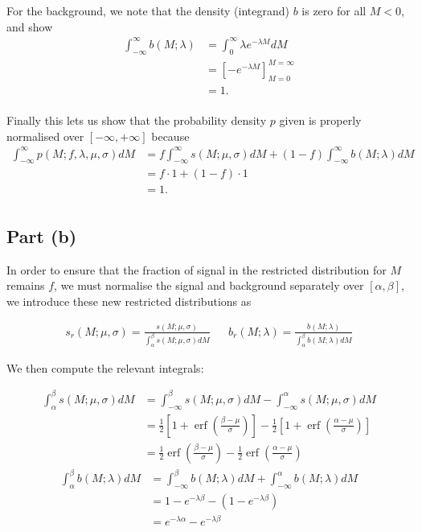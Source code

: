 \documentclass[12pt]{article}
\DeclareMathOperator{\erf}{erf}
\begin{document}
For the background, we note that the density (integrand) $b$ is zero for all $M<0$, and show
\begin{align*}
    \int_{-\infty}^\infty b(M;\lambda) & = \int_0^\infty \lambda e^{-\lambda M}dM \\
    & = \left[-e^{-\lambda M}\right]_{M=0}^{M=\infty} \\
    & = 1. \\
\end{align*}

Finally this lets us show that the probability density $p$ given is properly normalised over $[-\infty,+\infty]$ because
\begin{align*}
    \int_{-\infty}^\infty p(M; f,\lambda,\mu,\sigma)dM & = f\int_{-\infty}^\infty s(M;\mu, \sigma)dM + (1-f)\int_{-\infty}^\infty b(M;\lambda)dM \\
    & = f\cdot 1 + (1-f)\cdot 1\\
    & = 1. \\
\end{align*}

\subsection{Part (b)}

In order to ensure that the fraction of signal in the restricted distribution for $M$ remains $f$, we must normalise the signal and background separately over $[\alpha,\beta]$, we introduce these new restricted distributions as

\begin{align*}
    s_r(M;\mu,\sigma) = \frac{s(M;\mu,\sigma)}{\int_\alpha^\beta s(M;\mu,\sigma)dM} && b_r(M;\lambda) = \frac{b(M;\lambda)}{\int_\alpha^\beta b(M;\lambda)dM}
\end{align*}

We then compute the relevant integrals:

\begin{align*}
    \int_\alpha^\beta s(M;\mu,\sigma)dM & = \int_{-\infty}^\beta s(M;\mu,\sigma)dM - \int_{-\infty}^\alpha s(M;\mu,\sigma)dM \\
    & = \frac{1}{2}\left[1 + \erf\left(\frac{\beta - \mu}{\sigma}\right)\right] - \frac{1}{2}\left[1 + \erf\left(\frac{\alpha - \mu}{\sigma}\right)\right] \\
    & = \frac{1}{2}\erf\left(\frac{\beta - \mu}{\sigma}\right) - \frac{1}{2}\erf\left(\frac{\alpha - \mu}{\sigma}\right)
\end{align*}
\begin{align*}
    \int_\alpha^\beta b(M;\lambda)dM & = \int_{-\infty}^\beta b(M;\lambda)dM + \int_{-\infty}^\alpha b(M;\lambda)dM \\
    & = 1 - e^{-\lambda\beta} - (1 - e^{-\lambda\beta}) \\
    & = e^{-\lambda\alpha} - e^{-\lambda\beta}
\end{align*}
\end{document}
